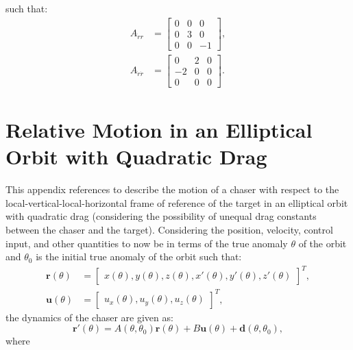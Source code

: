 such that:
\begin{subequations}
\begin{align}
    A_{\dot{r}r}&=\begin{bmatrix}
        0&0&0\\
        0&3&0\\
        0&0&-1
    \end{bmatrix},\\
    A_{\dot{r}\dot{r}}&=\begin{bmatrix}
        0&2&0\\
        -2&0&0\\
        0&0&0
    \end{bmatrix}.
\end{align}
\end{subequations}

\chapter{Relative Motion in an Elliptical Orbit with Quadratic Drag} \label{app:ellp-undrag}
This appendix references \cite{carter2002clohessy} to describe the motion of a chaser with respect to the local-vertical-local-horizontal frame of reference of the target in an elliptical orbit with quadratic drag (considering the possibility of unequal drag constants between the chaser and the target). Considering the position, velocity, control input, and other quantities to now be in terms of the true anomaly $\theta$ of the orbit and $\theta_0$ is the initial true anomaly of the orbit such that:
\begin{subequations}\begin{align}
    \boldsymbol{r}(\theta)&=\begin{bmatrix}
    x(\theta),y(\theta),z(\theta),x'(\theta),y'(\theta),z'(\theta)
    \end{bmatrix}^T,\\
    \boldsymbol{u}(\theta)&=\begin{bmatrix}
    u_x(\theta),u_y(\theta),u_z(\theta)
    \end{bmatrix}^T,
\end{align}
\end{subequations}
the dynamics of the chaser are given as:
\begin{equation}
    \boldsymbol{r}'(\theta)=A(\theta,\theta_0)\boldsymbol{r}(\theta)+B\boldsymbol{u}(\theta)+\boldsymbol{d}(\theta, \theta_0),
\end{equation}
where
